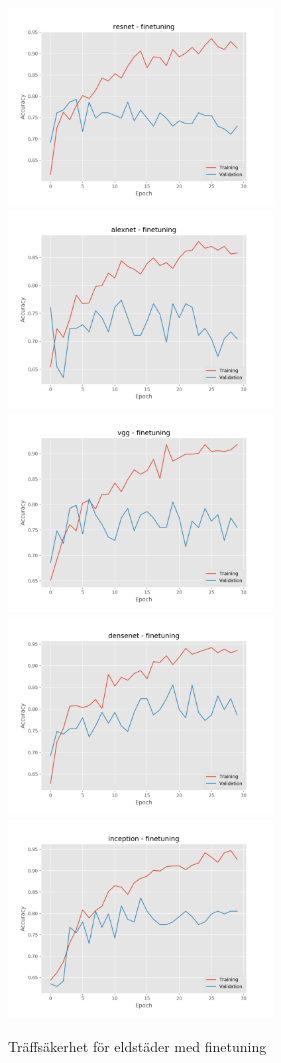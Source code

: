 \documentclass[]{kththesis}
\begin{document}
\begin{figure}[h]
  \includegraphics[width=7cm]{f_a_resnet_fine}
  \includegraphics[width=7cm]{f_a_alexnet_fine}
  \includegraphics[width=7cm]{f_a_vgg_fine}
  \includegraphics[width=7cm]{f_a_densenet_fine}
  \includegraphics[width=7cm]{f_a_inception_fine}
  \caption{Träffsäkerhet för eldstäder med finetuning}
  \label{fig:f_a_2}
\end{figure}
\end{document}
